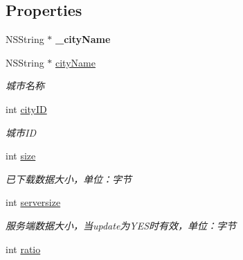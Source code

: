 \subsection*{Properties}
\begin{DoxyCompactItemize}
\item 
\hypertarget{interface_b_m_k_o_l_update_element_aa27dfbfc8e801d04ea9a55c43793fe24}{N\-S\-String $\ast$ {\bfseries \-\_\-city\-Name}}\label{interface_b_m_k_o_l_update_element_aa27dfbfc8e801d04ea9a55c43793fe24}

\item 
\hypertarget{interface_b_m_k_o_l_update_element_acf8998f896d5eee3bf25b5efaf316ffa}{N\-S\-String $\ast$ \hyperlink{interface_b_m_k_o_l_update_element_acf8998f896d5eee3bf25b5efaf316ffa}{city\-Name}}\label{interface_b_m_k_o_l_update_element_acf8998f896d5eee3bf25b5efaf316ffa}

\begin{DoxyCompactList}\small\item\em 城市名称 \end{DoxyCompactList}\item 
\hypertarget{interface_b_m_k_o_l_update_element_a0fc2ac335466b2fb891d1c3c430e14db}{int \hyperlink{interface_b_m_k_o_l_update_element_a0fc2ac335466b2fb891d1c3c430e14db}{city\-I\-D}}\label{interface_b_m_k_o_l_update_element_a0fc2ac335466b2fb891d1c3c430e14db}

\begin{DoxyCompactList}\small\item\em 城市\-I\-D \end{DoxyCompactList}\item 
\hypertarget{interface_b_m_k_o_l_update_element_a64207ce9d00c3127b02fbeaeb2dfc49c}{int \hyperlink{interface_b_m_k_o_l_update_element_a64207ce9d00c3127b02fbeaeb2dfc49c}{size}}\label{interface_b_m_k_o_l_update_element_a64207ce9d00c3127b02fbeaeb2dfc49c}

\begin{DoxyCompactList}\small\item\em 已下载数据大小，单位：字节 \end{DoxyCompactList}\item 
\hypertarget{interface_b_m_k_o_l_update_element_ad61b9f37f09ee7c2c2c41570c1329d1e}{int \hyperlink{interface_b_m_k_o_l_update_element_ad61b9f37f09ee7c2c2c41570c1329d1e}{serversize}}\label{interface_b_m_k_o_l_update_element_ad61b9f37f09ee7c2c2c41570c1329d1e}

\begin{DoxyCompactList}\small\item\em 服务端数据大小，当update为\-Y\-E\-S时有效，单位：字节 \end{DoxyCompactList}\item 
\hypertarget{interface_b_m_k_o_l_update_element_a8f26b0d8b91573b17f2314fe5795dcd4}{int \hyperlink{interface_b_m_k_o_l_update_element_a8f26b0d8b91573b17f2314fe5795dcd4}{ratio}}\label{interface_b_m_k_o_l_update_element_a8f26b0d8b91573b17f2314fe5795dcd4}


\end{DoxyCompactItemize}

